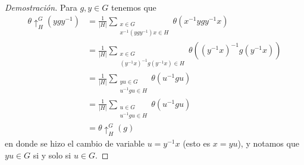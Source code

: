 \documentclass[12pt]{book}
\theoremstyle{definition}
\newcounter{in}
\begin{document}
\begin{proof}[Demostración]
  Para $g,y\in G$ tenemos que
  \begin{align*}
    \theta\uparrow^{G}_{H}(ygy^{-1})&=\frac{1}{|H|}\sum_{\substack{x\in
        G\\x^{-1}(ygy^{-1})x\in H}}\theta(x^{-1}ygy^{-1}x)\\
    &=\frac{1}{|H|}\sum_{\substack{x\in
        G\\(y^{-1}x)^{-1}g(y^{-1}x)\in H}}\theta((y^{-1}x)^{-1}g(y^{-1}x))\\
    &=\frac{1}{|H|}\sum_{\substack{yu\in
        G\\u^{-1}gu\in H}}\theta(u^{-1}gu)\\
     &=\frac{1}{|H|}\sum_{\substack{u\in
        G\\u^{-1}gu\in H}}\theta(u^{-1}gu)\\
    &=\theta\uparrow^{G}_{H}(g)
  \end{align*}
en donde se hizo el cambio de variable $u=y^{-1}x$ (esto es $x=yu$), y notamos
que $yu\in G$ si y solo si $u\in G$.
\end{proof}
\end{document}
